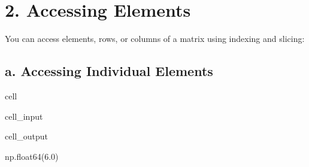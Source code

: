 \documentclass[letterpaper,10pt,english]{jupyterBook}
\begin{document}
\section{2. Accessing Elements}
\label{\detokenize{lessons/Intro_to_Matrices_in_NumPy:accessing-elements}}
\sphinxAtStartPar
You can access elements, rows, or columns of a matrix using indexing and slicing:


\subsection{a. Accessing Individual Elements}
\label{\detokenize{lessons/Intro_to_Matrices_in_NumPy:a-accessing-individual-elements}}
\begin{sphinxuseclass}{cell}\begin{sphinxVerbatimInput}

\begin{sphinxuseclass}{cell_input}
\begin{sphinxVerbatim}[commandchars=\\\{\}]
  \PYG{p}{[} \PYG{p}{]}
\end{sphinxVerbatim}

\end{sphinxuseclass}\end{sphinxVerbatimInput}
\begin{sphinxVerbatimOutput}

\begin{sphinxuseclass}{cell_output}
\begin{sphinxVerbatim}[commandchars=\\\{\}]
np.float64(6.0)
\end{sphinxVerbatim}

\end{sphinxuseclass}\end{sphinxVerbatimOutput}

\end{sphinxuseclass}
\end{document}
